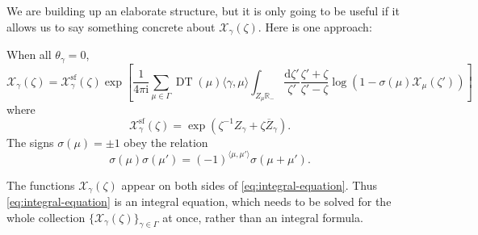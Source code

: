 \documentclass[12pt,letterpaper,reqno]{article}
\numberwithin{equation}{section}
\begin{document}
We are building up an elaborate structure,
but it is only going to be useful if it allows
us to say something concrete about
$\mathcal X_\gamma(\zeta)$. Here is one approach:

\begin{conj}[Integral equation for $\theta_\gamma = 0$] \label{conj:integral-equation}
When all $\theta_\gamma = 0$,
\begin{equation} \label{eq:integral-equation}
  \mathcal X_\gamma(\zeta) = \mathcal X_\gamma^{\mathrm{sf}}(\zeta) \exp \left[ \frac{1}{4\pi \mathrm i} \sum_{\mu \in \Gamma} \operatorname{DT}(\mu) \langle \gamma,\mu \rangle \int_{Z_\mu \mathbb R_-} \frac{\mathrm{d} \zeta'}{\zeta'} \frac{\zeta' + \zeta}{\zeta'-\zeta} \log(1 - \sigma(\mu) \mathcal X_\mu(\zeta')) \right]
\end{equation}
where 
\begin{equation}
  \mathcal X_\gamma^{\mathrm{sf}}(\zeta) = \exp \left( \zeta^{-1} Z_\gamma + \zeta \overline{Z}_\gamma \right).
\end{equation}
The signs $\sigma(\mu) = \pm 1$ obey the relation
\begin{equation}
  \sigma(\mu) \sigma(\mu') = (-1)^{\langle \mu,\mu' \rangle} \sigma(\mu + \mu').
\end{equation}
\end{conj}

The functions $\mathcal X_\gamma(\zeta)$ appear on both sides of
\eqref{eq:integral-equation}. Thus \eqref{eq:integral-equation} is an integral equation, which needs to be solved for 
the whole collection $\{\mathcal X_\gamma(\zeta)\}_{\gamma \in \Gamma}$
at once, rather than an integral formula.
\end{document}
